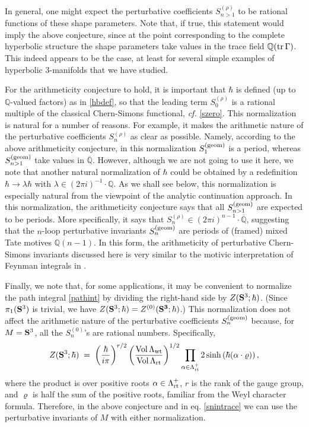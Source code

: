 \documentclass[hyper]{JHEP3}
\def\tr{{\rm tr\,}}
\newcommand\be{\begin{equation}}
\newcommand\ee{\end{equation}}
\newcommand{\Vol}{{\mbox{Vol\,}}}
\def\={\;=\;}
\begin{document}
In general, one might expect the perturbative coefficients $S_{n>1}^{(\rho)}$
to be rational functions of these shape parameters. Note that, if true, this statement
would imply the above conjecture, since at the point corresponding to the complete
hyperbolic structure the shape parameters take values in the trace field $\mathbb{Q} (\tr \Gamma)$.
This indeed appears to be the case, at least for several simple examples of
hyperbolic 3-manifolds that we have studied.

For the arithmeticity conjecture to hold, it is important that $\hbar$
is defined (up to $\mathbb{Q}$-valued factors) as in \eqref{hbdef},
so that the leading term $S_{0}^{(\rho)}$ is a rational multiple of
the classical Chern-Simons functional, {\it cf.} \eqref{szero}.
This normalization is natural for a number of reasons.
For example, it makes the arithmetic nature of the perturbative
coefficients $S_{n}^{(\rho)}$ as clear as possible.
Namely, according to the above arithmeticity conjecture,
in this normalization $S_{1}^{({\rm geom})}$ is a period,
whereas $S_{n>1}^{({\rm geom})}$ take values in $\overline{\mathbb{Q}}$.
However, although we are not going to use it here, we note that
another natural normalization of $\hbar$ could be obtained
by a redefinition $\hbar \to \lambda \hbar$ with $\lambda \in (2 \pi i)^{-1} \cdot \mathbb{Q}$.
As we shall see below, this normalization is especially natural from
the viewpoint of the analytic continuation approach.
In this normalization, the arithmeticity conjecture says that all
$S_{n>1}^{({\rm geom})}$ are expected to be periods.
More specifically, it says that $S_{n}^{(\rho)} \in (2 \pi i)^{n-1} \cdot \overline{\mathbb{Q}}$,
suggesting that the $n$-loop perturbative invariants $S_{n}^{({\rm geom})}$
are periods of (framed) mixed Tate motives $\mathbb{Q} (n-1)$.
In this form, the arithmeticity of perturbative Chern-Simons invariants
discussed here is very similar to the motivic interpretation
of Feynman integrals in \cite{bloch-2006}.

Finally, we note that, for some applications, it may be convenient to normalize
the path integral \eqref{pathint} by dividing the right-hand side by $Z({\bf S}^3;\hbar)$.
(Since $\pi_1 ({\bf S}^3)$ is trivial, we have $Z({\bf S}^3;\hbar) = Z^{(0)} ({\bf S^3};\hbar)$.)
This normalization does not affect the arithmetic nature of the perturbative
coefficients $S_n^{({\rm geom})}$ because, for $M = {\bf S}^3$, all the $S_n^{(0)}$'s
are rational numbers. Specifically,
\be
Z({\bf S}^3;\hbar) \= \left( {\hbar \over i \pi} \right)^{r/2}
\left( {\Vol \Lambda_{{\rm wt}} \over \Vol \Lambda_{{\rm rt}}} \right)^{1/2}
\prod_{\alpha \in \Lambda_{{\rm rt}}^+} 2 \sinh \left( \hbar (\alpha \cdot \varrho) \right),
\label{zsthree}
\ee
where the product is over positive roots $\alpha \in \Lambda_{{\rm rt}}^+$,
$r$ is the rank of the gauge group, and $\varrho$ is half the sum of the positive roots,
familiar from the Weyl character formula.
Therefore, in the above conjecture and in eq. \eqref{snintrace} we can use
the perturbative invariants of $M$ with either normalization.
\end{document}
